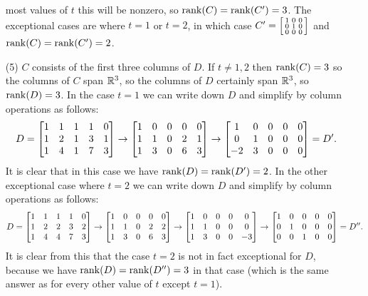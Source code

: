 \documentclass[a4paper]{amsart}
\renewenvironment{solution}{\SolutionInline}{\endSolutionInline}
\begin{document}
\begin{solution}
\begin{itemize}
   most values of $t$ this will be nonzero, so $\operatorname{rank}(C)=\operatorname{rank}(C')=3$.
   The exceptional cases are where $t=1$ or $t=2$, in which case
   $C'=\left[\begin{smallmatrix} 1&0&0 \\ 0&1&0\\ 0&0&0\end{smallmatrix}\right]$ and $\operatorname{rank}(C)=\operatorname{rank}(C')=2$.
  \item[(5)] $C$ consists of the first three columns of $D$.  If
   $t\neq 1,2$ then $\operatorname{rank}(C)=3$ so the columns of $C$ span ${\mathbb{R}}^3$, so
   the columns of $D$ certainly span ${\mathbb{R}}^3$, so $\operatorname{rank}(D)=3$.  In the
   case $t=1$ we can write down $D$ and simplify by column operations
   as follows:
   \[ D = \left[\begin{matrix} 1 & 1 & 1 & 1 & 0 \\
               1 & 2 & 1 & 3 & 1 \\
               1 & 4 & 1 & 7 & 3 \end{matrix}\right] \to
          \left[\begin{matrix} 1 & 0 & 0 & 0 & 0 \\
               1 & 1 & 0 & 2 & 1 \\
               1 & 3 & 0 & 6 & 3 \end{matrix}\right] \to
          \left[\begin{matrix} 1 & 0 & 0 & 0 & 0 \\
               0 & 1 & 0 & 0 & 0 \\
              -2 & 3 & 0 & 0 & 0 \end{matrix}\right]
        = D'.
   \]
   It is clear that in this case we have $\operatorname{rank}(D)=\operatorname{rank}(D')=2$.  In the
   other exceptional case where $t=2$ we can write down $D$ and
   simplify by column operations as follows:
   \[ D = \left[\begin{matrix} 1 & 1 & 1 & 1 & 0 \\
               1 & 2 & 2 & 3 & 2 \\
               1 & 4 & 4 & 7 & 3 \end{matrix}\right] \to
          \left[\begin{matrix} 1 & 0 & 0 & 0 & 0 \\
               1 & 1 & 0 & 2 & 2 \\
               1 & 3 & 0 & 6 & 3 \end{matrix}\right] \to
          \left[\begin{matrix} 1 & 0 & 0 & 0 & 0 \\
               1 & 1 & 0 & 0 & 0 \\
               1 & 3 & 0 & 0 &-3 \end{matrix}\right] \to
          \left[\begin{matrix} 1 & 0 & 0 & 0 & 0 \\
               0 & 1 & 0 & 0 & 0 \\
               0 & 0 & 1 & 0 & 0 \end{matrix}\right]
        = D''.
   \]
   It is clear from this that the case $t=2$ is not in fact
   exceptional for $D$, because we have $\operatorname{rank}(D)=\operatorname{rank}(D'')=3$ in that
   case (which is the same answer as for every other value of $t$
   except $t=1$).
 \end{itemize}
\end{solution}
\end{document}
